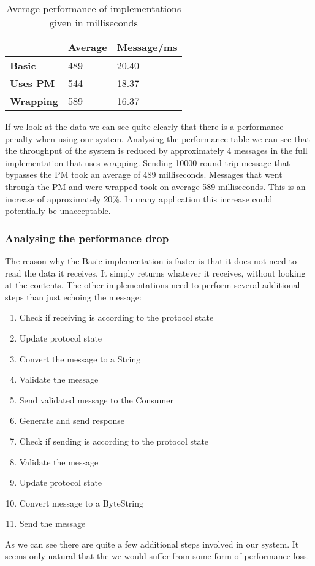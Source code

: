 \begin{table}[h]
	\centering
	\begin{tabular}{|l|l|l|}
		\hline
		{\bf }         & {\bf Average} & {\bf Message/ms} \\ \hline
		{\bf Basic}    & 489           & 20.40              \\ \hline
		{\bf Uses PM}  & 544           & 18.37              \\ \hline
		{\bf Wrapping} & 589           & 16.37              \\ \hline
	\end{tabular}
	\label{tab:performance}
	\caption{Average performance of implementations given in milliseconds}
\end{table}
If we look at the data we can see quite clearly that there is a performance penalty when using our system. Analysing the performance table we can see that the throughput of the system is reduced by approximately 4 messages in the full implementation that uses wrapping. Sending 10000 round-trip message that bypasses the PM took an average of 489 milliseconds. Messages that went through the PM and were wrapped took on average 589 milliseconds. This is an increase of approximately 20\%. In many application this increase could potentially be unacceptable. 


\subsubsection{Analysing the performance drop}
The reason why the Basic implementation is faster is that it does not need to read the data it receives. It simply returns whatever it receives, without looking at the contents. The other implementations need to perform several additional steps than just echoing the message:
\begin{enumerate}
  \item Check if receiving is according to the protocol state
  \item Update protocol state
  \item Convert the message to a String 
  \item Validate the message
  \item Send validated message to the Consumer
  \item Generate and send response
  \item Check if sending is according to the protocol state
  \item Validate the message
  \item Update protocol state
  \item Convert message to a ByteString
  \item Send the message
\end{enumerate}
As we can see there are quite a few additional steps involved in our system. It seems only natural that the we would suffer from some form of performance loss.

